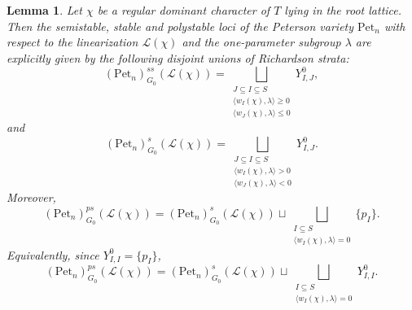 \documentclass[12pt, reqno]{amsart}
\theoremstyle{plain}
\numberwithin{equation}{section}
\newtheorem{lemma}[theorem]{Lemma}
\theoremstyle{definition}
\begin{document}
\begin{lemma}\label{lem:stability-strata}
Let $\chi$ be a regular dominant character of $T$ lying in the root lattice. Then the semistable, stable and polystable loci of the Peterson variety $\mathrm{Pet}_{n}$ with respect to the linearization $\mathcal{L}(\chi)$ and the one-parameter subgroup $\lambda$ are explicitly given by the following disjoint unions of Richardson strata: 
\[
(\mathrm{Pet}_n)^{ss}_{G_0}(\mathcal L(\chi))
=
\bigsqcup_{\substack{J\subseteq I\subseteq S\\
\langle w_I(\chi),\lambda\rangle\ge0\\
\langle w_J(\chi),\lambda\rangle\le0}}
Y^0_{I,J},
\]
and
\[
(\mathrm{Pet}_n)^s_{G_0}(\mathcal L(\chi))
=
\bigsqcup_{\substack{J\subseteq I\subseteq S\\
\langle w_I(\chi),\lambda\rangle>0\\
\langle w_J(\chi),\lambda\rangle<0}}
Y^0_{I,J}.
\]
Moreover,
\[
(\mathrm{Pet}_n)^{ps}_{G_0}(\mathcal L(\chi))
=
(\mathrm{Pet}_n)^s_{G_0}(\mathcal L(\chi))
\sqcup
\bigsqcup_{\substack{I\subseteq S\\
\langle w_I(\chi),\lambda\rangle=0}}
\{p_I\}.
\]
Equivalently, since \(Y^0_{I,I}=\{p_I\}\),
\[
(\mathrm{Pet}_n)^{ps}_{G_0}(\mathcal L(\chi))
=
(\mathrm{Pet}_n)^s_{G_0}(\mathcal L(\chi))
\sqcup
\bigsqcup_{\substack{I\subseteq S\\
\langle w_I(\chi),\lambda\rangle=0}}
Y^0_{I,I}.
\]
\end{lemma}
\end{document}
